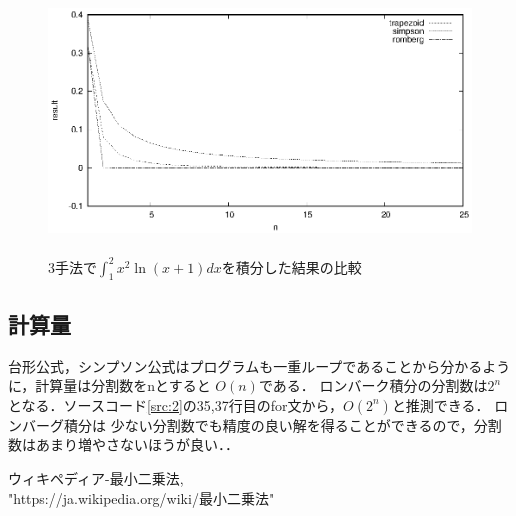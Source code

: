 \documentclass[titlepage]{jsarticle}
\begin{document}
\begin{figure}[]
	\centering
	\includegraphics[height=7cm]{2/res.eps}
	\caption{3手法で$\displaystyle \int^2_1 x^2\ln (x+1)dx$を積分した結果の比較}
	\label{fig:res2}
\end{figure}


\subsection{計算量}
台形公式，シンプソン公式はプログラムも一重ループであることから分かるように，計算量は分割数をnとすると
$O(n)$である．
ロンバーク積分の分割数は$2^n$となる．ソースコード\ref{src:2}の35,37行目のfor文から，$O(2^n)$と推測できる．
ロンバーグ積分は
少ない分割数でも精度の良い解を得ることができるので，分割数はあまり増やさないほうが良い．．


\begin{thebibliography}{99}
	 ウィキペディア-最小二乗法, \\
	"https://ja.wikipedia.org/wiki/最小二乗法"
\end{thebibliography}
\end{document}

